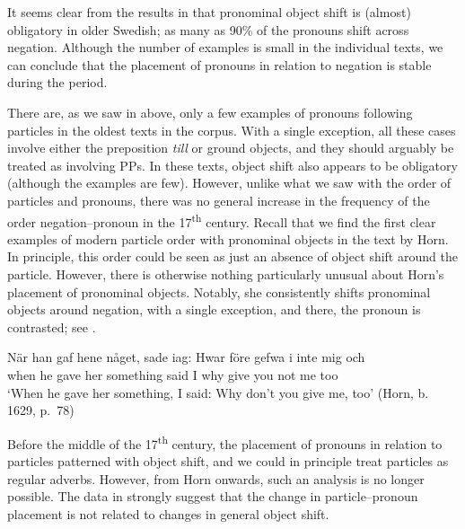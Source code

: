 \documentclass[output=paper]{langscibook}
\begin{document}
It seems clear from the results in  that pronominal object shift is (almost) obligatory in older Swedish; as many as 90\% of the pronouns shift across negation. Although the number of examples is small in the individual texts, we can conclude that the placement of pronouns in relation to negation is stable during the period.



There are, as we saw in  above, only a few examples of pronouns following particles in the oldest texts in the corpus. With a single exception, all these cases involve either the preposition \textit{till} or ground objects, and they should arguably be treated as involving PPs. In these texts, object shift also appears to be obligatory (although the examples are few). However, unlike what we saw with the order of particles and pronouns, there was no general increase in the frequency of the order negation–pronoun in the 17\textsuperscript{th} century. Recall that we find the first clear examples of modern particle order with pronominal objects in the text by Horn. In principle, this order could be seen as just an absence of object shift around the particle. However, there is otherwise nothing particularly unusual about Horn’s placement of pronominal objects. Notably, she consistently shifts pronominal objects around negation, with a single exception, and there, the pronoun is contrasted; see .


\ea\label{ex:lalu:52}
\gll  När       han  gaf   hene   någet,       sade   iag:   Hwar före gefwa   i     inte   mig   och\\
when    he   gave   her   something   said   I       why   give     you   not   me   too\\
\glt `When he gave her something, I said: Why don’t you give me, too’ (Horn, b. 1629, p.~78)\\
\z


Before the middle of the 17\textsuperscript{th} century, the placement of pronouns in relation to particles patterned with object shift, and we could in principle treat particles as regular adverbs. However, from Horn onwards, such an analysis is no longer possible. The data in  strongly suggest that the change in particle–pronoun placement is not related to changes in general object shift.
\end{document}
